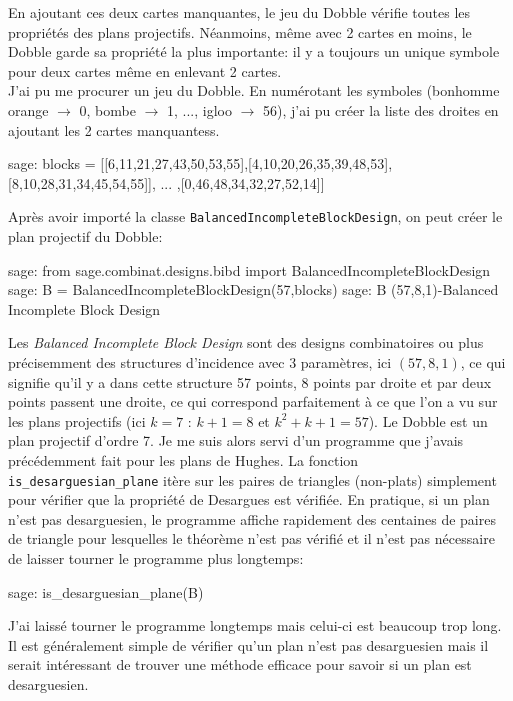 \documentclass[a4paper]{article}
\begin{document}
En ajoutant ces deux cartes manquantes, le jeu du Dobble vérifie toutes les propriétés des plans projectifs. Néanmoins, même avec 2 cartes en moins, le Dobble garde sa propriété la plus importante: il y a toujours un unique symbole pour deux cartes même en enlevant 2 cartes.\vspace{1\baselineskip}\\
J'ai pu me procurer un jeu du Dobble. En numérotant les symboles (bonhomme orange $\rightarrow$ 0, bombe $\rightarrow$ 1, ..., igloo $\rightarrow$ 56), j'ai pu créer la liste des droites en ajoutant les 2 cartes manquantess.
\begin{sageverbatim}
  sage: blocks = [[6,11,21,27,43,50,53,55],[4,10,20,26,35,39,48,53],
        [8,10,28,31,34,45,54,55]], ... ,[0,46,48,34,32,27,52,14]]
\end{sageverbatim}
Après avoir importé la classe \texttt{BalancedIncompleteBlockDesign}, on peut créer le plan projectif du Dobble:
\begin{sageverbatim}
 sage: from sage.combinat.designs.bibd import BalancedIncompleteBlockDesign
 sage: B = BalancedIncompleteBlockDesign(57,blocks)
 sage: B
 (57,8,1)-Balanced Incomplete Block Design
\end{sageverbatim}
Les \textit{Balanced Incomplete Block Design} sont des designs combinatoires ou plus précisemment des structures d'incidence avec 3 paramètres, ici $(57, 8, 1)$, ce qui signifie qu'il y a dans cette structure 57 points, 8 points par droite et par deux points passent une droite, ce qui correspond parfaitement à ce que l'on a vu sur les plans projectifs (ici $k=7$ : $k+1=8$ et $k^2+k+1=57$).
Le Dobble est un plan projectif d'ordre 7.
\newpage
Je me suis alors servi d'un programme que j'avais précédemment fait pour les plans de Hughes. La fonction \texttt{is\_desarguesian\_plane} itère sur les paires de triangles (non-plats) simplement pour vérifier que la propriété de Desargues est vérifiée. En pratique, si un plan n'est pas desarguesien, le programme affiche rapidement des centaines de paires de triangle pour lesquelles le théorème n'est pas vérifié et il n'est pas nécessaire de laisser tourner le programme plus longtemps:
\begin{sageverbatim}
  sage: is_desarguesian_plane(B)
  
\end{sageverbatim}
J'ai laissé tourner le programme longtemps mais celui-ci est beaucoup trop long. Il est généralement simple de vérifier qu'un plan n'est pas desarguesien mais il serait intéressant de trouver une méthode efficace pour savoir si un plan est desarguesien.\\ 
\end{document}

